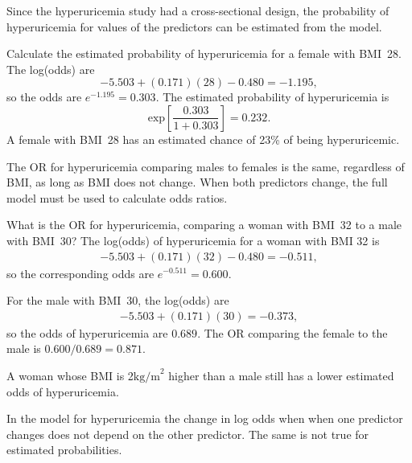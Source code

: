 Since the hyperuricemia study had a cross-sectional design, the probability of hyperuricemia for values of the predictors can be estimated from the model.

\begin{examplewrap} 
\begin{nexample}{Calculate the estimated probability of hyperuricemia for a female with BMI~28.}
The log(odds) are
\[
    -5.503 + (0.171)(28)  - 0.480 = -1.195,
\]
so the odds are $e^{-1.195} = 0.303$.  The estimated probability of hyperuricemia is
\[
   \text{exp}  \left[ \frac{0.303}{1 + 0.303} \right] = 0.232.
\]
A female with BMI~28 has an estimated chance of 23\% of being hyperuricemic.

\label{example:huBMISexProbabilities}
\end{nexample}
\end{examplewrap}

The OR for hyperuricemia comparing males to females is the same, regardless of BMI, as long as BMI does not change. When both predictors change, the full model must be used to calculate odds ratios.

\begin{examplewrap}
\begin{nexample}{What is the OR for hyperuricemia, comparing a woman with BMI~32 to a male with BMI~30?}
The log(odds) of hyperuricemia for a woman with BMI 32 is
\begin{align*}
   -5.503 + (0.171)(32) - 0.480 = -0.511,
\end{align*}
so the corresponding odds are $e^{-0.511} = 0.600$.

For the male with BMI~30, the log(odds) are
\begin{align*}
-5.503 + (0.171)(30) = -0.373,
\end{align*}
so the odds of hyperuricemia are $0.689$.
The OR comparing the female to the male is $0.600/0.689 = 0.871$.

A woman whose BMI is 2$\text{kg/m}^2$ higher than a male still has a lower estimated odds of hyperuricemia.
\label{example:ORBMI3032}
\end{nexample}
\end{examplewrap}

In the model for hyperuricemia the change in log odds when when one predictor changes does not depend on the other predictor.  The same is not true for estimated probabilities.


